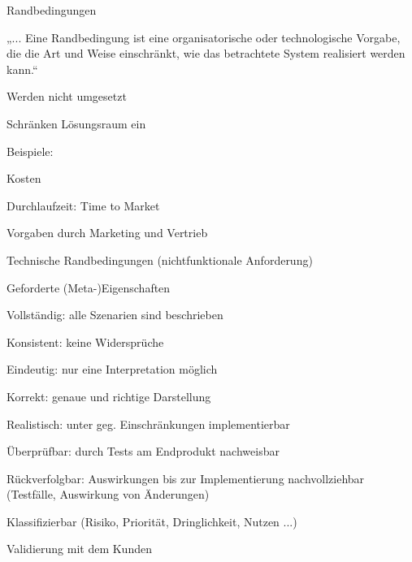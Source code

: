 \documentclass[a4paper]{article}
\begin{document}
\begin{multicols}{3}
  Randbedingungen
  \begin{itemize*}
    \item „... Eine Randbedingung ist eine organisatorische oder technologische Vorgabe, die die Art und Weise einschränkt, wie das betrachtete System realisiert werden kann.“
    \item Werden nicht umgesetzt
    \item Schränken Lösungsraum ein
    \item Beispiele:
          \begin{itemize*}
            \item Kosten
            \item Durchlaufzeit: Time to Market
            \item Vorgaben durch Marketing und Vertrieb
            \item Technische Randbedingungen (nichtfunktionale Anforderung)
          \end{itemize*}
  \end{itemize*}


  Geforderte (Meta-)Eigenschaften
  \begin{itemize*}
    \item Vollständig: alle Szenarien sind beschrieben
    \item Konsistent: keine Widersprüche
    \item Eindeutig: nur eine Interpretation möglich
    \item Korrekt: genaue und richtige Darstellung
    \item Realistisch: unter geg. Einschränkungen implementierbar
    \item Überprüfbar: durch Tests am Endprodukt nachweisbar
    \item Rückverfolgbar: Auswirkungen bis zur Implementierung nachvollziehbar (Testfälle, Auswirkung von Änderungen)
    \item Klassifizierbar (Risiko, Priorität, Dringlichkeit, Nutzen ...)
    \item Validierung mit dem Kunden
  \end{itemize*}


\end{multicols}
\end{document}
